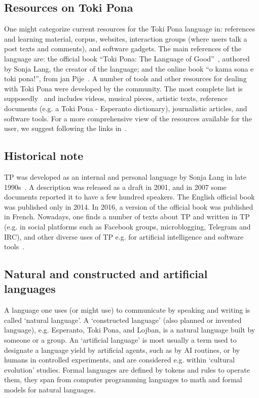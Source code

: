 \subsection{Resources on Toki Pona}
One might categorize current resources for the Toki Pona
language in: references and learning material, corpus,
websites, interaction groups
(where users talk a post texts and comments), and software gadgets.
The main references of the language are:
  the official book ``Toki Pona: The Language of Good''~\cite{tpLang},
    authored by Sonja Lang, the creator of the language;
and the online book ``o kama sona e toki pona!'',
from jan Pije~\cite{kama}.
A number of tools and other resources for dealing with Toki Pona
were developed by the community.
The most complete list is supposedly~\cite{gdoc} and includes
videos, musical pieces, artistic texts, reference documents (e.g.
a Toki Pona - Esperanto dictionary), journalistic articles,
and software tools.
For a more comprehensive view of the resources available
for the user, we suggest following the links 
in~\cite{gdoc,wikiToki}.

\subsection{Historical note}
TP was developed as an internal and personal language
by Sonja Lang in late 1990s~\cite{interview}.
A description was released as a draft in 2001, and in 2007 some documents
reported it to have a few hundred speakers.
The English official book~\cite{tpLang} was published only in 2014.
In 2016, a version of the official book was published in French.
Nowadays, one finds a number of texts about TP and written
in TP (e.g. in social platforms such as Facebook groups,
microblogging, Telegram and IRC),
and other diverse uses of TP e.g. for artificial intelligence and software tools~\cite{gdoc}. 

\subsection{Natural and constructed and artificial languages}
A language one uses (or might use) to communicate by speaking
and writing is called `natural language'.
A `constructed language' (also planned or invented language),
e.g. Esperanto, Toki Pona, and Lojban, is a natural language built by someone or
a group.
An `artificial language' is most usually a term used
to designate a language yield by artificial agents,
such as by AI routines, or by humans in controlled experiments,
and are considered e.g. within `cultural evolution' studies.
Formal languages are defined by tokens and rules to
operate them, they span from computer programming languages
to math and formal models for natural languages.

